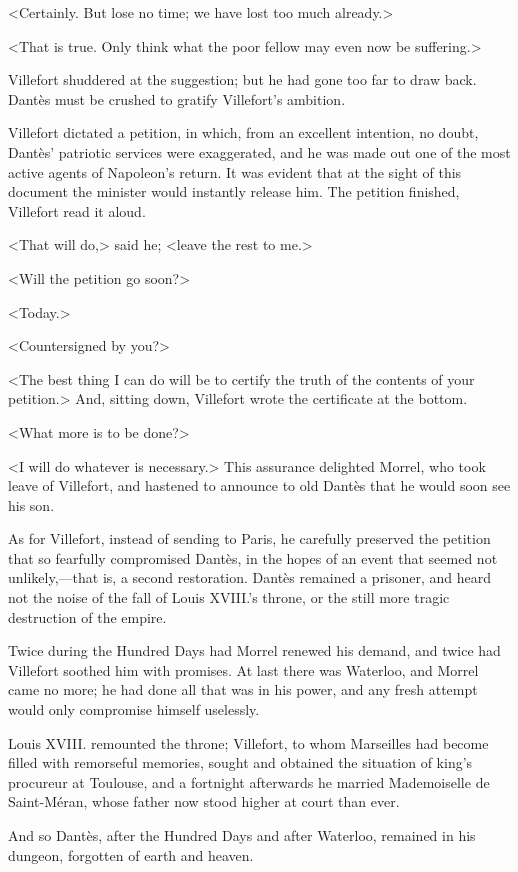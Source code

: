  <Certainly. But lose no time; we have lost too much already.> 

 <That is true. Only think what the poor fellow may even now be suffering.> 

 Villefort shuddered at the suggestion; but he had gone too far to draw back. Dantès must be crushed to gratify Villefort's ambition. 

 Villefort dictated a petition, in which, from an excellent intention, no doubt, Dantès' patriotic services were exaggerated, and he was made out one of the most active agents of Napoleon's return. It was evident that at the sight of this document the minister would instantly release him. The petition finished, Villefort read it aloud. 

 <That will do,> said he; <leave the rest to me.> 

 <Will the petition go soon?> 

 <Today.> 

 <Countersigned by you?> 

 <The best thing I can do will be to certify the truth of the contents of your petition.> And, sitting down, Villefort wrote the certificate at the bottom. 

 <What more is to be done?> 

 <I will do whatever is necessary.> This assurance delighted Morrel, who took leave of Villefort, and hastened to announce to old Dantès that he would soon see his son. 

 As for Villefort, instead of sending to Paris, he carefully preserved the petition that so fearfully compromised Dantès, in the hopes of an event that seemed not unlikely,—that is, a second restoration. Dantès remained a prisoner, and heard not the noise of the fall of Louis XVIII.'s throne, or the still more tragic destruction of the empire. 

 Twice during the Hundred Days had Morrel renewed his demand, and twice had Villefort soothed him with promises. At last there was Waterloo, and Morrel came no more; he had done all that was in his power, and any fresh attempt would only compromise himself uselessly. 

 Louis XVIII. remounted the throne; Villefort, to whom Marseilles had become filled with remorseful memories, sought and obtained the situation of king's procureur at Toulouse, and a fortnight afterwards he married Mademoiselle de Saint-Méran, whose father now stood higher at court than ever. 

 And so Dantès, after the Hundred Days and after Waterloo, remained in his dungeon, forgotten of earth and heaven. 

